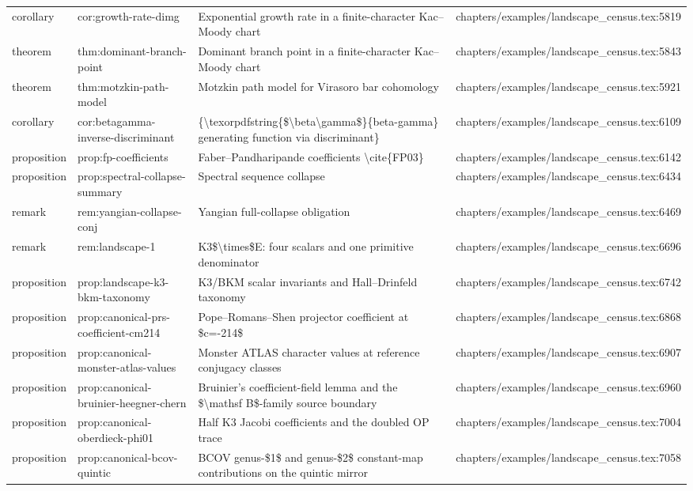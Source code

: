\documentclass[11pt]{article}
\begin{document}
\begin{longtable}{L{0.10\textwidth}L{0.26\textwidth}L{0.42\textwidth}L{0.22\textwidth}}
corollary & cor:growth-rate-dimg & Exponential growth rate in a finite-character Kac--Moody chart & chapters/examples/landscape\_census.tex:5819\\
theorem & thm:dominant-branch-point & Dominant branch point in a finite-character Kac--Moody chart & chapters/examples/landscape\_census.tex:5843\\
theorem & thm:motzkin-path-model & Motzkin path model for Virasoro bar cohomology & chapters/examples/landscape\_census.tex:5921\\
corollary & cor:betagamma-inverse-discriminant & \{\textbackslash{}texorpdfstring\{\$\textbackslash{}beta\textbackslash{}gamma\$\}\{beta-gamma\} generating function via discriminant\} & chapters/examples/landscape\_census.tex:6109\\
proposition & prop:fp-coefficients & Faber--Pandharipande coefficients \textbackslash{}cite\{FP03\} & chapters/examples/landscape\_census.tex:6142\\
proposition & prop:spectral-collapse-summary & Spectral sequence collapse & chapters/examples/landscape\_census.tex:6434\\
remark & rem:yangian-collapse-conj & Yangian full-collapse obligation & chapters/examples/landscape\_census.tex:6469\\
remark & rem:landscape-1 & K3\$\textbackslash{}times\$E: four scalars and one primitive denominator & chapters/examples/landscape\_census.tex:6696\\
proposition & prop:landscape-k3-bkm-taxonomy & K3/BKM scalar invariants and Hall--Drinfeld taxonomy & chapters/examples/landscape\_census.tex:6742\\
proposition & prop:canonical-prs-coefficient-cm214 & Pope--Romans--Shen projector coefficient at \$c=-214\$ & chapters/examples/landscape\_census.tex:6868\\
proposition & prop:canonical-monster-atlas-values & Monster ATLAS character values at reference conjugacy classes & chapters/examples/landscape\_census.tex:6907\\
proposition & prop:canonical-bruinier-heegner-chern & Bruinier's coefficient-field lemma and the \$\textbackslash{}mathsf B\$-family source boundary & chapters/examples/landscape\_census.tex:6960\\
proposition & prop:canonical-oberdieck-phi01 & Half K3 Jacobi coefficients and the doubled OP trace & chapters/examples/landscape\_census.tex:7004\\
proposition & prop:canonical-bcov-quintic & BCOV genus-\$1\$ and genus-\$2\$ constant-map contributions on the quintic mirror & chapters/examples/landscape\_census.tex:7058\\

\end{longtable}
\end{document}
